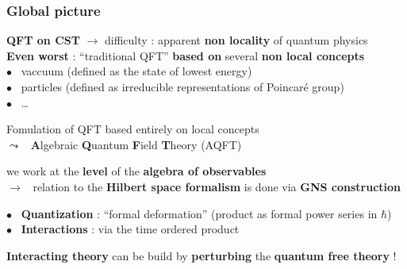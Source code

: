 \documentclass[9pt]{beamer}
\begin{document}
\begin{frame}

\frametitle{Global picture}

\vfill

\textdbend \quad \textbf{QFT on CST} $\to$ difficulty : apparent \textbf{non locality} of quantum physics \  \\

\textbf{Even worst} : ``traditional QFT'' \textbf{based on} several \textbf{non local concepts} \\

\quad $\bullet$ \ vaccuum (defined as the state of lowest energy) \\
\quad $\bullet$ \ particles (defined as irreducible representations of Poincaré group) \\
\quad $\bullet$ \ \dots \\

\vspace*{-12pt}

\begin{block}{\vspace*{-3ex}}
\vspace*{-10pt}
\begin{center}
Fomulation of QFT based entirely on local concepts \\
$\leadsto$ \ \textbf{A}lgebraic \textbf{Q}uantum \textbf{F}ield \textbf{T}heory (AQFT) \\
\end{center}
\vspace*{-7pt}
\end{block}

\vfill

we work at the \textbf{level} of the \textbf{algebra of observables} \\
$\to$ \ relation to the \textbf{Hilbert space formalism} is done via \textbf{GNS construction} \\

\vfill

$\bullet$ \ \textbf{Quantization} : ``formal deformation'' (product as formal power series in $\hbar$) \\ 

$\bullet$ \ \textbf{Interactions} : via the time ordered product

\vspace*{-12pt}

\begin{block}{\vspace*{-3ex}}
\vspace*{-10pt}
\begin{center}
\textbf{Interacting theory} can be build by \textbf{perturbing} the \textbf{quantum free theory} !
\end{center}
\vspace*{-7pt}
\end{block}

\vfill

\end{frame}
\end{document}
